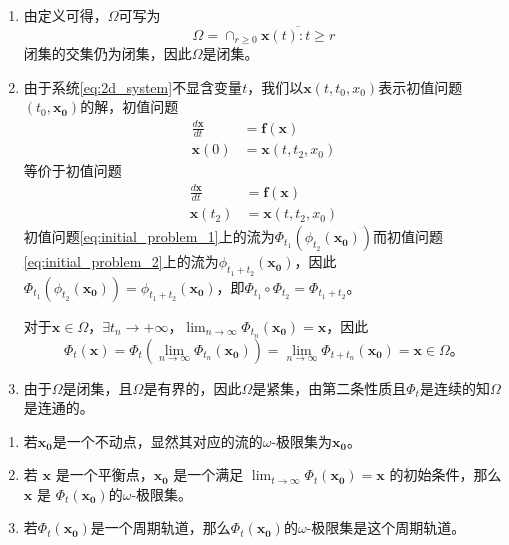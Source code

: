 \begin{pf}
    \begin{enumerate}
        \item 由定义可得，$\Omega$可写为
        \begin{equation*}
            \Omega=\cap_{r\geq 0}\overline{\mathbf{x}(t):t\geq r}
        \end{equation*}
        闭集的交集仍为闭集，因此$\Omega$是闭集。
        \item 由于系统\ref{eq:2d_system}不显含变量$t$，我们以$\mathbf{x}(t,t_0,x_0)$表示初值问题$(t_0,\mathbf{x_0})$的解，初值问题
        \begin{equation}\label{eq:initial_problem_1}
            \begin{aligned}
                \frac{d\mathbf{x}}{dt} & =\mathbf{f}(\mathbf{x}) \\
                \mathbf{x}(0) & =\mathbf{x}(t,t_2,x_0)
            \end{aligned}
        \end{equation}
        等价于初值问题
        \begin{equation}\label{eq:initial_problem_2}
            \begin{aligned}
                \frac{d\mathbf{x}}{dt} & =\mathbf{f}(\mathbf{x}) \\
                \mathbf{x}(t_2) & =\mathbf{x}(t,t_2,x_0)
            \end{aligned}
        \end{equation}
        初值问题\ref{eq:initial_problem_1}上的流为$\Phi_{t_1}(\phi_{t_2}(\mathbf{x_0}))$而初值问题\ref{eq:initial_problem_2}上的流为$\phi_{t_1+t_2}(\mathbf{x_0})$，因此$\Phi_{t_1}(\phi_{t_2}(\mathbf{x_0}))=\phi_{t_1+t_2}(\mathbf{x_0})$，即$\Phi_{t_1}\circ\Phi_{t_2}=\Phi_{t_1+t_2}$。

        对于$\mathbf{x}\in\Omega$，$\exists t_n\to +\infty$，$\lim_{n\to\infty}\Phi_{t_n}(\mathbf{x_0})=\mathbf{x}$，因此
        \begin{equation*}
            \Phi_t(\mathbf{x})=\Phi_{t}(\lim_{n\to\infty}\Phi_{t_n}(\mathbf{x_0}))=\lim_{n\to\infty}\Phi_{t+t_n}(\mathbf{x_0})=\mathbf{x}\in \Omega。
        \end{equation*}
        \item 由于$\Omega$是闭集，且$\Omega$是有界的，因此$\Omega$是紧集，由第二条性质且$\Phi_t$是连续的知$\Omega$是连通的。
    \end{enumerate}
\end{pf}
\begin{exmp}
    \begin{enumerate}
        \item 若$\mathbf{x_0}$是一个不动点，显然其对应的流的$\omega$-极限集为$\mathbf{x_0}$。
        \item 若 $\mathbf{x}$ 是一个平衡点，$\mathbf{x_0}$ 是一个满足 $\lim_{t\to\infty}\Phi_t(\mathbf{x_0}) = \mathbf{x}$ 的初始条件，那么 $\mathbf{x}$ 是 $\Phi_t(\mathbf{x_0})$的$\omega$-极限集。
        \item 若$\Phi_t(\mathbf{x_0})$是一个周期轨道，那么$\Phi_t(\mathbf{x_0})$的$\omega$-极限集是这个周期轨道。
    \end{enumerate}
\end{exmp}
